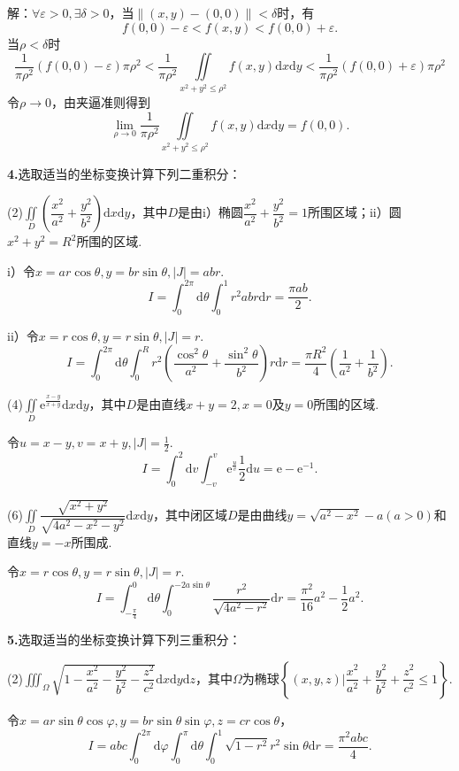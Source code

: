 \documentclass[12pt, a4paper]{article}
\newcommand{\e}{\mathrm{e}}
\newcommand{\dif}{\mathrm{d}}
\begin{document}
解：\(\forall \varepsilon > 0, \exists \delta > 0\)，当\(\left\|(x, y) - (0, 0)\right\| < \delta\)时，有
\[f(0, 0) - \varepsilon < f(x, y) < f(0, 0) + \varepsilon.\]
当\(\rho < \delta\)时
\[\frac{1}{\pi\rho^2} (f(0, 0) - \varepsilon)\pi\rho^2 < \frac{1}{\pi\rho^2} \iint\limits_{x^2 + y^2 \leq \rho^2} f(x, y) \dif x \dif y < \frac{1}{\pi\rho^2} (f(0, 0) + \varepsilon)\pi\rho^2\]
令\(\rho \to 0\)，由夹逼准则得到
\[\lim_{\rho \to 0} \frac{1}{\pi\rho^2} \iint\limits_{x^2 + y^2 \leq \rho^2} f(x, y) \dif x \dif y = f(0, 0).\]

\textbf{4.}选取适当的坐标变换计算下列二重积分：

(2)\(\iint\limits_D \left(\dfrac{x^2}{a^2} + \dfrac{y^2}{b^2}\right) \dif x \dif y\)，其中\(D\)是由i）椭圆\(\dfrac{x^2}{a^2} + \dfrac{y^2}{b^2} = 1\)所围区域；ii）圆\(x^2 + y^2 = R^2\)所围的区域.

i）令\(x = ar\cos\theta, y = br\sin\theta, |J| = abr\).
\[I = \int_{0}^{2\pi} \dif \theta \int_0^1 r^2 abr \dif r = \frac{\pi ab}{2}.\]

ii）令\(x = r\cos\theta, y = r\sin\theta, |J| = r\).
\[I = \int_{0}^{2\pi} \dif \theta \int_0^R r^2\left(\frac{\cos^2\theta}{a^2} + \frac{\sin^2\theta}{b^2}\right)r \dif r = \frac{\pi R^2}{4}\left(\frac{1}{a^2} + \frac{1}{b^2}\right).\]

(4)\(\iint\limits_D \e^{\frac{x - y}{x + y}} \dif x \dif y\)，其中\(D\)是由直线\(x + y = 2, x = 0\)及\(y = 0\)所围的区域.

令\(u = x - y, v = x + y, |J| = \frac{1}{2}\).
\[I = \int_0^2 \dif v \int_{-v}^{v} \e^{\frac{u}{v}} \frac{1}{2} \dif u = \e - \e^{-1}.\]

(6)\(\iint\limits_D \dfrac{\sqrt{x^2 + y^2}}{\sqrt{4a^2 - x^2 - y^2}} \dif x \dif y\)，其中闭区域\(D\)是由曲线\(y = \sqrt{a^2 - x^2} - a(a > 0)\)和直线\(y = -x\)所围成.

令\(x = r\cos\theta, y = r\sin\theta, |J| = r\).
\[I = \int_{-\frac{\pi}{4}}^{0} \dif \theta \int_{0}^{-2a\sin\theta} \frac{r^2}{\sqrt{4a^2 - r^2}} \dif r = \frac{\pi^2}{16}a^2 - \frac{1}{2}a^2.\]

\textbf{5.}选取适当的坐标变换计算下列三重积分：

(2)\(\iiint_\Omega \sqrt{1 - \dfrac{x^2}{a^2} - \dfrac{y^2}{b^2} - \dfrac{z^2}{c^2}} \dif x \dif y \dif z\)，其中\(\Omega\)为椭球\(\left\{(x, y, z)|\dfrac{x^2}{a^2} + \dfrac{y^2}{b^2} + \dfrac{z^2}{c^2} \leq 1 \right\}\).

令\(x = ar\sin\theta\cos\varphi, y = br\sin\theta\sin\varphi, z = cr\cos\theta\)，
\[I = abc \int_{0}^{2\pi} \dif \varphi \int_0^\pi \dif \theta \int_0^1 \sqrt{1 - r^2}r^2\sin\theta \dif r = \frac{\pi^2abc}{4}.\]
\end{document}
